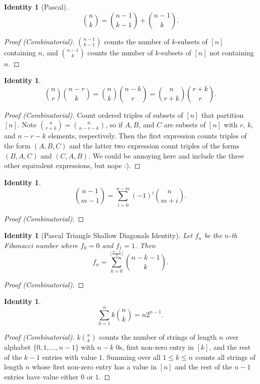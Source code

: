 \documentclass[12]{article}
\newcounter{identityCounter}
\newtheorem{iden}[identityCounter]{Identity}
\theoremstyle{definition}
\begin{document}
	\begin{iden}[Pascal]
		$${n \choose k} = {n-1 \choose k-1} + {n-1 \choose k}.$$
	\end{iden}
	\begin{proof}[Proof (Combinatorial)]
		${n-1 \choose k-1}$ counts the number of $k$-subsets of $[n]$ containing $n$, and ${n-1 \choose k}$ counts the number of $k$-subsets of $[n]$ not containing $n$.
	\end{proof}
	
	\begin{iden}
		$${n \choose r} {n-r \choose k} = {n \choose k} {n-k \choose r} = {n \choose r+k} {r+k \choose r}.$$
	\end{iden}
	\begin{proof}[Proof (Combinatorial)]
		Count ordered triples of subsets of $[n]$ that partition $[n]$.  Note ${n \choose r+k} = {n \choose n-r-k}$, so if $A, B$, and $C$ are subsets of $[n]$ with $r$, $k$, and $n-r-k$ elements, respectively.  Then the first expression counts triples of the form $(A,B,C)$ and the latter two expression count triples of the forms $(B,A,C)$ and $(C,A,B)$.  We could be annoying here and include the three other equivalent expressions, but nope :).
	\end{proof}

	\begin{iden}
		$${n-1 \choose m-1} = \sum_{i=0}^{n-m} (-1)^i {n \choose m+i}.$$
	\end{iden}
	\begin{proof}[Proof (Combinatorial)]
		
	\end{proof}

	
	\begin{iden}[Pascal Triangle Shallow Diagonals Identity]
		Let $f_n$ be the $n$-th Fibonacci number where $f_0 = 0$ and $f_1 = 1$.  Then
		$$f_n = \sum_{k = 0}^{ \big\lfloor\tfrac{n-1}{2} \big\rfloor } { n- k - 1 \choose k}.$$
	\end{iden}
	\begin{proof}[Proof (Combinatorial)]
		
	\end{proof}
	
	\begin{iden}
		$$\sum_{k=1}^n k{n \choose k} = n2^{n-1}.$$
	\end{iden}
	\begin{proof}[Proof (Combinatorial)]
		$k{n \choose k}$ counts the number of strings of length $n$ over alphabet $\{0, 1, \ldots, n-1\}$ with $n-k$ $0$s, first non-zero entry in $[k]$, and the rest of the $k-1$ entries with value $1$.  Summing over all $1 \leq k \leq n$ counts all strings of length $n$ whose first non-zero entry has a value in $[n]$ and the rest of the $n-1$ entries have value either $0$ or $1$.
	\end{proof}
	
\end{document}
